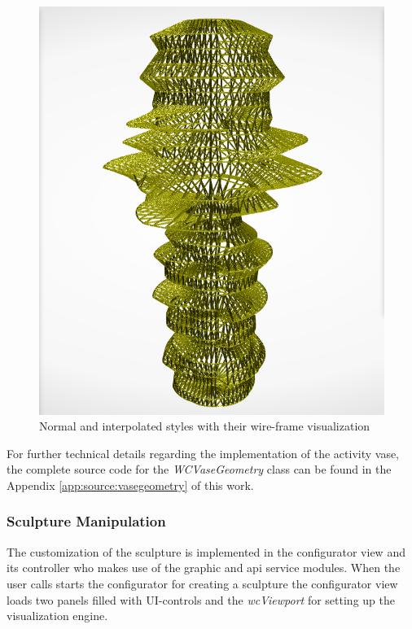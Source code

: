 \documentclass[../medieninformatik-arbeit.tex]{subfiles}
\begin{document}
\begin{figure}[t!]
\begin{minipage}{.225\textwidth}
\end{minipage}
\begin{minipage}{.225\textwidth}
\centering
  \includegraphics[width=\linewidth]{Configurator/img/sculpture-2w}
\end{minipage}
\caption{\protect Normal and interpolated styles with their wire-frame visualization}
\label{fig:sculpture styles}
\end{figure}

For further technical details regarding the implementation of the activity vase, the complete source code for the \textit{WCVaseGeometry} class can be found in the Appendix \ref{app:source:vasegeometry} of this work.

\subsubsection{Sculpture Manipulation}
\label{sub:sculpturegeneration}
The customization of the sculpture is implemented in the configurator view and its controller who makes use of the graphic and api service modules. When the user calls starts the configurator for creating a sculpture the configurator view loads two panels filled with UI-controls and the \textit{wcViewport} for setting up the visualization engine. 
\end{document}
